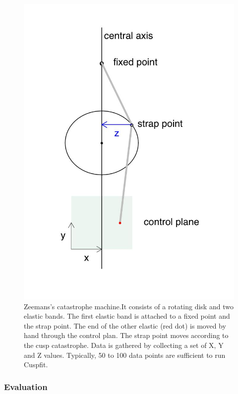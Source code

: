 \documentclass[
  a4paper,
  DIV=11,
  numbers=noendperiod,
  oneside]{scrreprt}
\begin{document}
\begin{figure}

{\centering \includegraphics{media/ch3/image26.jpg}

}

\caption{\label{fig-ch3-img26-old-38}Zeemans's catastrophe machine.It
consists of a rotating disk and two elastic bands. The first elastic
band is attached to a fixed point and the strap point. The end of the
other elastic (red dot) is moved by hand through the control plan. The
strap point moves according to the cusp catastrophe. Data is gathered by
collecting a set of X, Y and Z values. Typically, 50 to 100 data points
are sufficient to run Cuspfit.}

\end{figure}

\hypertarget{sec-Evaluation}{%
\subsubsection{Evaluation}\label{sec-Evaluation}}
\end{document}
